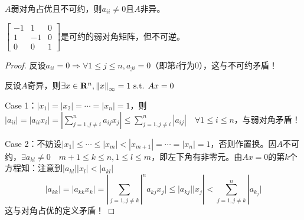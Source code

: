 \documentclass{ctexart}
\begin{document}
\begin{Thm}
$A$弱对角占优且不可约，则$a_{ii}\neq 0$且$A$非异。
\end{Thm}

\begin{Eg}
$\begin{bmatrix}-1& 1& 0\\1& -1&0\\0 &0& 1\end{bmatrix}$是可约的弱对角矩阵，但不可逆。
\end{Eg}

\begin{proof}
反设$a_{ii}=0\Rightarrow \forall 1\leq j\leq n, a_{ji}=0$（即第$i$行为0），这与不可约矛盾！

反设$A$奇异，则$\exists x\in\mathbf{R}^n, \left\|x\right\|_\infty=1\text{ s.t. } Ax=0$

Case 1：$|x_1|=|x_2|=\cdots=|x_n|=1$，则$|a_{ii}|=|a_{ii}x_i|=|\sum\limits_{j=1,j\neq i}^n a_{ij}x_j|\leq \sum\limits_{j=1,j\neq i}^n|a_{ij}|\quad \forall 1\leq i\leq n$，与弱对角矛盾！

Case 2：不妨设$|x_1|\leq \cdots \leq|x_m|<|x_{m+1}|=\cdots=|x_n|=1$，否则作置换。因$A$不可约，$\exists a_{kl}\neq 0\quad m+1\leq k\leq n,1\leq l\leq m$，即左下角有非零元。由$Ax=0$的第$k$个方程知：注意到$|a_{kl}||x_l|<|a_{kl}|$
\[|a_{kk}|=|a_{kk}x_k|=|\sum_{j=1,j\neq k}|^n a_{kj}x_j|\leq |a_{kj}||x_j|<\sum_{j=1,j\neq k}^n|a_{k_j}|\]
这与对角占优的定义矛盾！
\end{proof}
\end{document}
